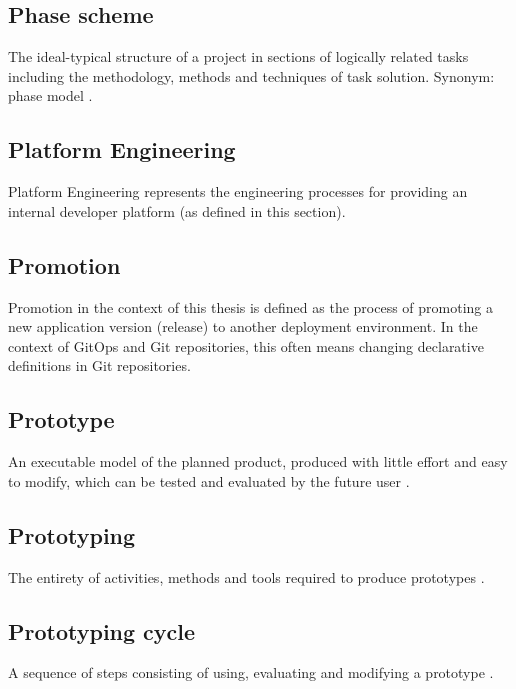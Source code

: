 \subsection*{Phase scheme}
The ideal-typical structure of a project in sections of logically related tasks including the methodology,
methods and techniques of task solution. Synonym: phase model
\autocite{riedlManagementInformatik2019}.

\subsection*{Platform Engineering}

Platform Engineering represents the engineering processes
for providing an internal developer platform (as defined in this section).

\subsection*{Promotion}

Promotion in the context of this thesis is defined as
the process of promoting a new application version (release)
to another deployment environment.
In the context of GitOps and Git repositories,
this often means changing declarative definitions in Git repositories.

\subsection*{Prototype}
An executable model of the planned product, produced with little effort and easy to modify,
which can be tested and evaluated by the future user
\autocite{riedlManagementInformatik2019}.

\subsection*{Prototyping}
The entirety of activities, methods and tools required to produce prototypes
\autocite{riedlManagementInformatik2019}.

\subsection*{Prototyping cycle}
A sequence of steps consisting of using, evaluating and modifying a prototype
\autocite{riedlManagementInformatik2019}.





